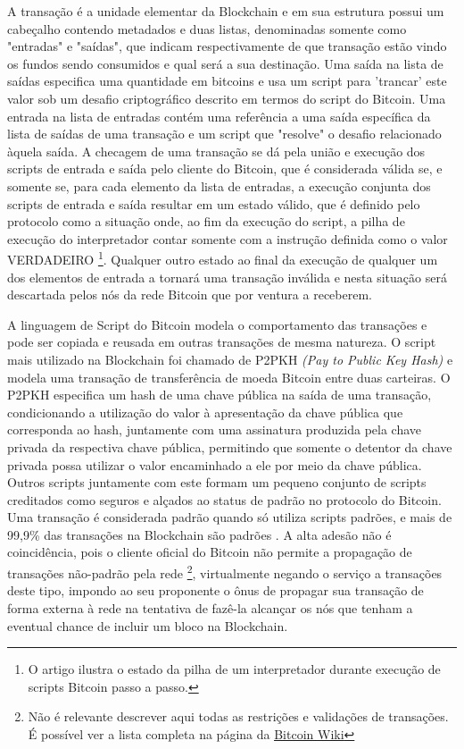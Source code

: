 \documentclass[a4paper,11pt]{article}
\newcommand{\link}[2]{{\color{blue}\underline{\href{#1}{#2}}}}
\begin{document}

A transação é a unidade elementar da Blockchain e em sua estrutura possui um cabeçalho contendo metadados e duas listas, denominadas somente como "entradas" e "saídas", que indicam respectivamente de que transação estão vindo os fundos sendo consumidos e qual será a sua destinação.
Uma saída na lista de saídas especifica uma quantidade em bitcoins e usa um script para 'trancar' este valor sob um desafio criptográfico descrito em termos do script do Bitcoin.
Uma entrada na lista de entradas contém uma referência a uma saída específica da lista de saídas de uma transação e um script que "resolve" o desafio relacionado àquela saída.
A checagem de uma transação se dá pela união e execução dos scripts de entrada e saída pelo cliente do Bitcoin, que é considerada válida se, e somente se, para cada elemento da lista de entradas, a execução conjunta dos scripts de entrada e saída resultar em um estado válido, que é definido pelo protocolo como a situação onde, ao fim da execução do script, a pilha de execução do interpretador contar somente com a instrução definida como o valor VERDADEIRO
\footnote{O artigo \cite{Bistarelli2019} ilustra o estado da pilha de um interpretador durante execução de scripts Bitcoin passo a passo.}.
Qualquer outro estado ao final da execução de qualquer um dos elementos de entrada a tornará uma transação inválida e nesta situação será descartada pelos nós da rede Bitcoin que por ventura a receberem.

A linguagem de Script do Bitcoin modela o comportamento das transações e pode ser copiada e reusada em outras transações de mesma natureza.
O script mais utilizado na Blockchain foi chamado de P2PKH \emph{(Pay to Public Key Hash)} e modela uma transação de transferência de moeda Bitcoin entre duas carteiras.
O P2PKH especifica um hash de uma chave pública na saída de uma transação, condicionando a utilização do valor à apresentação da chave pública que corresponda ao hash, juntamente com uma assinatura produzida pela chave privada da respectiva chave pública, permitindo que somente o detentor da chave privada possa utilizar o valor encaminhado a ele por meio da chave pública.
Outros scripts juntamente com este formam um pequeno conjunto de scripts creditados como seguros e alçados ao status de padrão no protocolo do Bitcoin.
Uma transação é considerada padrão quando só utiliza scripts padrões, e mais de 99,9\% das transações na Blockchain são padrões \cite{Bistarelli2019}.
A alta adesão não é coincidência, pois o cliente oficial do Bitcoin não permite a propagação de transações não-padrão pela
rede
\footnote{Não é relevante descrever aqui todas as restrições e validações de transações. É possível ver a lista completa na página da \link{https://en.bitcoin.it/wiki/Protocol_rules\#.22tx.22_messages}{Bitcoin Wiki}},
virtualmente negando o serviço a transações deste tipo, impondo ao seu proponente o ônus de propagar sua transação de forma externa à rede na tentativa de fazê-la alcançar os nós que tenham a eventual chance de incluir um bloco na Blockchain.
\end{document}
